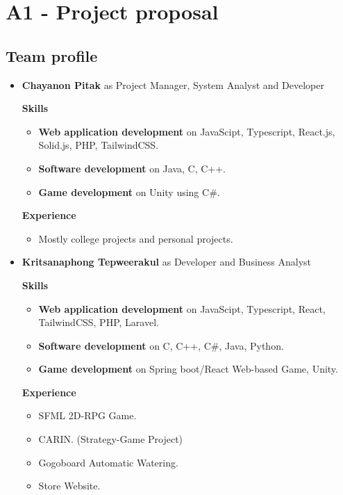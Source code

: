 \documentclass[ 10pt]{report}
\begin{document}
    \chapter{A1 - Project proposal}
    \section{Team profile}
        \begin{itemize}
            \item \textbf{Chayanon Pitak} as Project Manager, System Analyst and Developer
            
                \textbf{Skills}
                \begin{itemize}
                    \item \textbf{Web application development} on JavaScipt, Typescript, React.js, Solid.js, PHP, TailwindCSS.
                    \item \textbf{Software development} on Java, C, C++.
                    \item \textbf{Game development} on Unity using C\#.
                \end{itemize}

                \textbf{Experience}
                \begin{itemize}
                    \item Mostly college projects and personal projects.
                \end{itemize}
            \item \textbf{Kritsanaphong Tepweerakul} as Developer and Business Analyst
                
                \textbf{Skills}
                \begin{itemize}
                    \item \textbf{Web application development} on JavaScipt, Typescript, React, TailwindCSS, PHP, Laravel.
                    \item \textbf{Software development} on C, C++, C\#, Java, Python.
                    \item \textbf{Game development} on Spring boot/React Web-based Game, Unity.
                \end{itemize}
                
                \textbf{Experience}
                \begin{itemize}
                    \item SFML 2D-RPG Game.
                    \item CARIN. (Strategy-Game Project)
                    \item Gogoboard Automatic Watering.
                    \item Store Website.
                \end{itemize}


\end{itemize}
\end{document}
